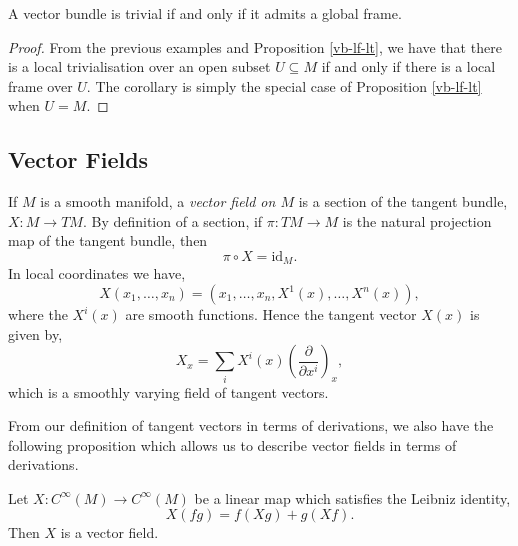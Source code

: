 \documentclass[12pt,a4paper]{article}
\begin{document}
\begin{corollary}
A vector bundle is trivial if and only if it admits a global frame.
\end{corollary}
\begin{proof}
From the previous examples and Proposition \ref{vb-lf-lt}, we have that there is a local trivialisation over an open subset $U\subseteq M$ if and only if there is a local frame over $U$. The corollary is simply the special case of Proposition \ref{vb-lf-lt} when $U=M$.
\end{proof}
\pagebreak
\subsection{Vector Fields}
\begin{definition}
If $M$ is a smooth manifold, a \textit{vector field on $M$} is a section of the tangent bundle, $X:M\to TM$. By definition of a section, if $\pi:TM\to M$ is the natural projection map of the tangent bundle, then
\[
\pi\circ X=\mathrm{id}_M.
\] 
In local coordinates we have,
\[
X(x_1,\ldots,x_n)=(x_1,\ldots,x_n,X^1(x),\ldots,X^n(x)),
\]
where the $X^i(x)$ are smooth functions. Hence the tangent vector $X(x)$ is given by,
\begin{equation}
X_x=\sum_iX^i(x)\left(\frac{\partial}{\partial x^i}\right)_x,
\label{eq:vect-local}
\end{equation}
which is a smoothly varying field of tangent vectors.
\end{definition}
From our definition of tangent vectors in terms of derivations, we also have the following proposition which allows us to describe vector fields in terms of derivations.
\begin{proposition}
Let $X:C^{\infty}(M)\to C^{\infty}(M)$ be a linear map which satisfies the Leibniz identity,
\[
X(fg)=f(Xg)+g(Xf).
\]
Then $X$ is a vector field.
\end{proposition}
\end{document}
